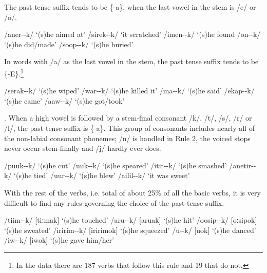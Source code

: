 The past tense suffix tends to be \{-a\}, when the last vowel in the stem is /e/ or /o/. 

\ea
\ea
/aner--k/  `(s)he aimed at'
\ex
/sirek--k/  `it scratched'
\ex
/imen--k/  `(s)he found
\ex
/on--k/  `(s)he did/made'
\ex
/soop--k/  `(s)he buried'
\z
\z

In words with /a/ as the last vowel in the stem, the past tense suffix tends to be \{\nobreakdash-E\}.\footnote{In the data there are 187 verbs that follow this rule and 19 that do not.}

\ea
\ea
/serak--k/  `(s)he wiped'
\ex
/war--k/  `(s)he killed it'
\ex
/ma--k/  `(s)he said'
\ex
/ekap--k/  `(s)he came'
\ex
/aaw--k/  `(s)he got/took'
\z
\z

\ea
{}. When a high vowel is followed by a stem-final consonant /k/, /t/, /s/, /r/ or /l/, the past tense suffix is \{-a\}.  This group of consonants includes nearly all of the non-labial consonant phonemes; /n/ is handled in Rule 2, the voiced stops never occur stem-finally and /j/ hardly ever does.  
\z

\ea
\ea
/puuk--k/  `(s)he cut'
\ex
/mik--k/  `(s)he speared'
\ex
/itit--k/  `(s)he smashed'
\ex
/anetir--k/  `(s)he tied'
\ex
/{\textphi}uur--k/  `(s)he blew'
\ex
/a{\textphi}ilil--k/  `it was sweet'
\z
\z

With the rest of the verbs, i.e. total of about 25\% of all the basic verbs, it is very difficult to find any rules governing the choice of the past tense suffix.

\ea
\ea
/tiim--k/  [{{\textprimstress}tiːmak}]  `(s)he touched'
\ex
/aru{\textphi}--k/  [a{{\textprimstress}ru}{\textphi}ak]  `(s)he hit'
\ex
/oosip--k/  [{{\textprimstress}oːsipok}]  `(s)he sweated'
\ex
/{\textphi}iririm--k/  [{\textphi}i{{\textprimstress}ririmok}]  `(s)he squeezed'
\ex
/u{\textphi}--k/  [u{\textphi}{{\textprimstress}ok}]  `(s)he danced'
\ex
/iw--k/  [iw{{\textprimstress}ok}]   `(s)he gave him/her'
\z
\z

